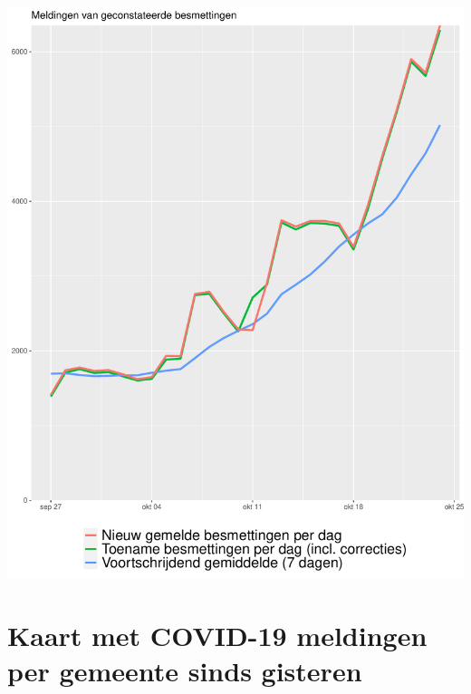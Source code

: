 \documentclass[
  english,
  man,floatsintext]{apa6}
\begin{document}
\includegraphics{daily_report_files/figure-latex/Gemelde besmettingen-1.pdf}

\newpage

\hypertarget{kaart-met-covid-19-meldingen-per-gemeente-sinds-gisteren}{%
\section{Kaart met COVID-19 meldingen per gemeente sinds gisteren}\label{kaart-met-covid-19-meldingen-per-gemeente-sinds-gisteren}}
\end{document}
